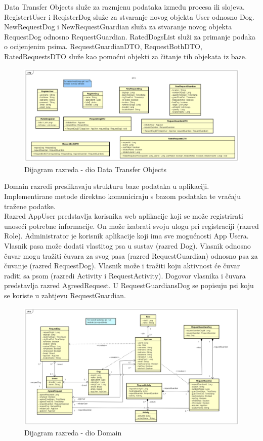 		
			Data Transfer Objects služe za razmjenu podataka između procesa ili slojeva.\\
			RegistertUser i ReqisterDog služe za stvaranje novog objekta User odnosno Dog.
			NewRequestDog i NewRequestGuardian služa za stvaranje novog objekta RequestDog odnosno RequestGuardian.
			RatedDogsList služi za primanje podaka o ocijenjenim psima.
			RequestGuardianDTO, RequestBothDTO, RatedRequestsDTO služe kao pomoćni objekti za čitanje tih objekata iz baze.
			\eject
			
			\begin{figure}[htb]
				\centering
				\includegraphics[width=16cm]{slike/dijagram_razreda_DTO}
				\caption{Dijagram razreda - dio Data Transfer Objects}
				\label{fig:Class-Diagram}
			\end{figure}
		
		
			Domain razredi preslikavaju strukturu baze podataka u aplikaciji. Implementirane metode direktno komuniciraju s bazom podataka te vraćaju tražene podatke.\\
			Razred AppUser predstavlja korisnika web aplikacije koji se može registrirati unoseći potrebne informacije. On može izabrati svoju ulogu pri registraciji (razred Role). Administrator je korisnik aplikacije koji ima sve mogućnosti App Usera. Vlasnik pasa može dodati vlastitog psa u sustav (razred Dog). Vlasnik odnosno čuvar mogu tražiti čuvara za svog pasa (razred RequestGuardian) odnosno psa za čuvanje (razred RequestDog). Vlasnik može i tražiti koju aktivnost će čuvar raditi sa psom (razredi Activity i RequestActivity). Dogovor vlasnika i čuvara predstavlja razred AgreedRequest. U RequestGuardiansDog se popisuju psi koju se koriste u zahtjevu RequestGuardian.
			
			\begin{figure}[htb]
				\centering
				\includegraphics[width=16cm]{slike/class_diagram_domain}
				\caption{Dijagram razreda - dio Domain}
				\label{fig:Class-Diagram}
			\end{figure}
	
